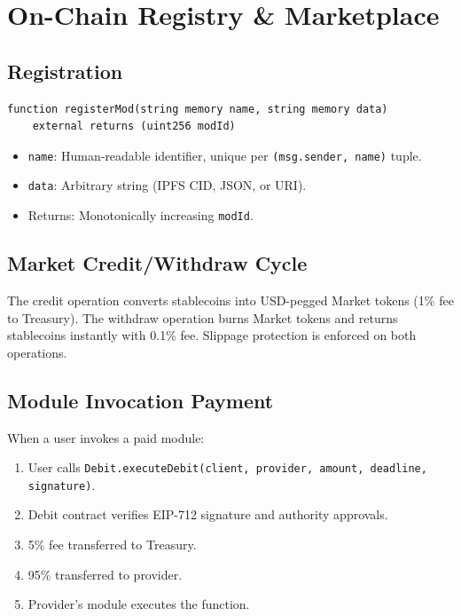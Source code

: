 \documentclass[11pt,a4paper]{article}
\begin{document}
\section{On-Chain Registry \& Marketplace}
\label{sec:marketplace}

\subsection{Registration}

\begin{lstlisting}[style=solidity]
function registerMod(string memory name, string memory data)
    external returns (uint256 modId)
\end{lstlisting}

\begin{itemize}
    \item \texttt{name}: Human-readable identifier, unique per \texttt{(msg.sender, name)} tuple.
    \item \texttt{data}: Arbitrary string (IPFS CID, JSON, or URI).
    \item Returns: Monotonically increasing \texttt{modId}.
\end{itemize}

\subsection{Market Credit/Withdraw Cycle}

The credit operation converts stablecoins into USD-pegged Market tokens (1\% fee to Treasury). The withdraw operation burns Market tokens and returns stablecoins instantly with 0.1\% fee. Slippage protection is enforced on both operations.

\subsection{Module Invocation Payment}

When a user invokes a paid module:
\begin{enumerate}
    \item User calls \texttt{Debit.executeDebit(client, provider, amount, deadline, signature)}.
    \item Debit contract verifies EIP-712 signature and authority approvals.
    \item 5\% fee transferred to Treasury.
    \item 95\% transferred to provider.
    \item Provider's module executes the function.
\end{enumerate}
\end{document}
